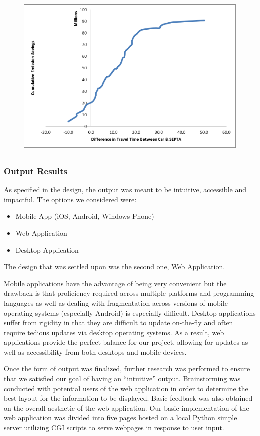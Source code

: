\begin{figure}[htp]
  \centering
  \includegraphics[height=8cm]{graphics/graph2.png}
  \caption{}
\end{figure}

\subsubsection{Output Results}

As specified in the design, the output was meant to be intuitive,
accessible and impactful. The options we considered were:

\begin{itemize}
    \item Mobile App (iOS, Android, Windows Phone)
    \item Web Application
    \item Desktop Application
\end{itemize}

The design that was settled upon was the second one, Web Application.

Mobile applications have the advantage of being very convenient but
the drawback is that proficiency required across multiple platforms
and programming languages as well as dealing with fragmentation across
versions of mobile operating systems (especially Android) is
especially difficult. Desktop applications suffer from rigidity in
that they are difficult to update on-the-fly and often require tedious
updates via desktop operating systems. As a result, web applications
provide the perfect balance for our project, allowing for updates as
well as accessibility from both desktops and mobile devices.

Once the form of output was finalized, further research was performed
to ensure that we satisfied our goal of having an ``intuitive''
output. Brainstorming was conducted with potential users of the web
application in order to determine the best layout for the information
to be displayed. Basic feedback was also obtained on the overall
aesthetic of the web application. Our basic implementation of the web
application was divided into five pages hosted on a local Python
simple server utilizing CGI scripts to serve webpages in response to
user input.

